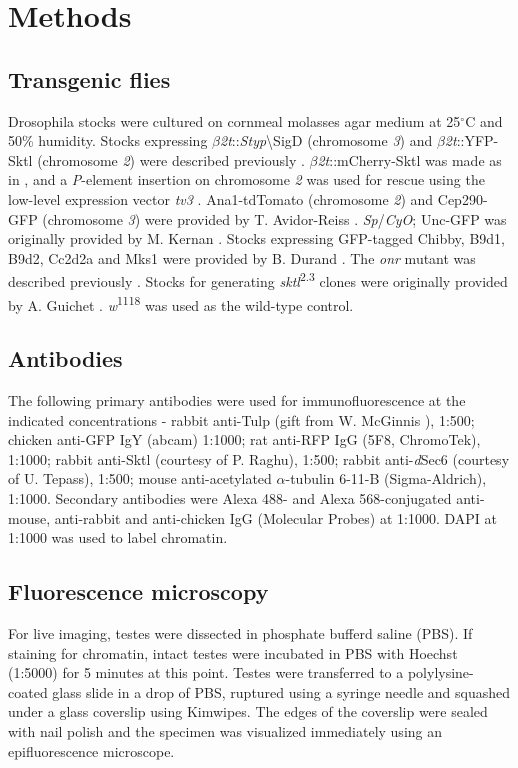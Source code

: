 \documentclass[12pt, twoside, letterpaper]{article}
\begin{document}
\section{Methods}
\subsection{Transgenic flies}
Drosophila stocks were cultured on cornmeal molasses agar medium at 25$^{\circ}$C
and 50\% humidity.
Stocks expressing $\beta$\textit{2t}::\textit{Styp}\textbackslash{SigD} (chromosome \textit{3})
and $\beta$\textit{2t}::YFP-Sktl (chromosome \textit{2})
were described previously \citep{wei2008depletion, fabian2010phosphatidylinositol}.
$\beta$\textit{2t}::mCherry-Sktl was made as in \citep{wei2008depletion},
and a \textit{P}-element insertion on chromosome \textit{2} was used for rescue using the low-level
expression vector \textit{tv3} \citep{wong2005pip2}.
Ana1-tdTomato (chromosome \textit{2}) and Cep290-GFP (chromosome \textit{3}) were provided
by T. Avidor-Reiss \citep{basiri2014migrating}.
\textit{Sp}/\textit{CyO}; Unc-GFP was originally provided by M. Kernan \citep{baker2004mechanosensory}.
Stocks expressing GFP-tagged Chibby, B9d1, B9d2, Cc2d2a and Mks1 were
provided by B. Durand \citep{enjolras2012drosophila, vieillard2016transition}.
The \textit{onr} mutant was described previously \citep{giansanti2015exocyst}.
Stocks for generating \textit{sktl}\textsuperscript{2.3} clones were originally provided by
A. Guichet \citep{gervais2008pip5k}.
\textit{w}\textsuperscript{1118} was used as the wild-type control.

\subsection{Antibodies}
The following primary antibodies were used for immunofluorescence
at the indicated concentrations -
rabbit anti-Tulp (gift from W. McGinnis \citep{ronshaugen2002structure}), 1:500;
chicken anti-GFP IgY (abcam) 1:1000;
rat anti-RFP IgG (5F8, ChromoTek), 1:1000;
rabbit anti-Sktl (courtesy of P. Raghu), 1:500;
rabbit anti-\textit{d}Sec6 (courtesy of U. Tepass), 1:500;
mouse anti-acetylated $\alpha$-tubulin 6-11-B (Sigma-Aldrich), 1:1000.
Secondary antibodies were Alexa 488- and Alexa 568-conjugated
anti-mouse, anti-rabbit and anti-chicken
IgG (Molecular Probes) at 1:1000.
DAPI at 1:1000 was used to label chromatin.

\subsection{Fluorescence microscopy}
For live imaging, testes were dissected in phosphate bufferd saline (PBS).
If staining for chromatin, intact testes were incubated in PBS with
Hoechst (1:5000) for 5 minutes at this point.
Testes were transferred to a polylysine-coated glass slide in a drop of PBS,
ruptured using a syringe needle and
squashed under a glass coverslip using Kimwipes.
The edges of the coverslip were sealed with nail polish
and the specimen was visualized immediately using an epifluorescence microscope.
\end{document}
